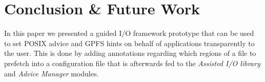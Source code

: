 \section{Conclusion \& Future Work}
\label{sec: conclusion}

In this paper we presented a guided I/O framework prototype that can be used to set POSIX advice and GPFS hints on behalf of applications transparently to the user. This is done by adding annotations regarding which regions of a file to prefetch into a configuration file that is afterwards fed to the \textit{Assisted I/O library} and \textit{Advice Manager} modules. %

 
